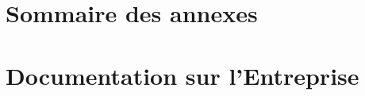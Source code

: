 \documentclass[a4paper, 11pt, french]{report}
\begin{document}
                                                                                                                                                                                                                                                                                         \chapter{Sommaire
                                                                                                                                                                                                                                                                                         des
                                                                                                                                                                                                                                                                                         annexes}
                                                                                                                                                                                                                                                                                           \chapter{Documentation
                                                                                                                                                                                                                                                                                           sur
                                                                                                                                                                                                                                                                                           l'Entreprise}
\end{document}
